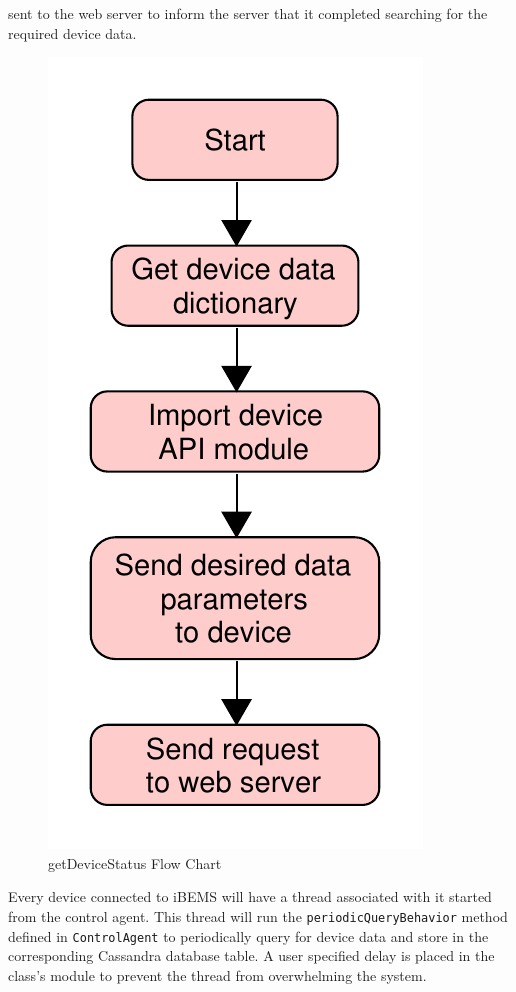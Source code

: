 \documentclass[conference]{IEEEtran}
\begin{document}
sent to the web server to inform the server that it completed searching for the
required device data. %
%
\begin{figure}[htbp]
    \centering
    \includegraphics[scale=0.3]{figs/agents/getDeviceStatus.pdf}
    \caption{getDeviceStatus Flow Chart}
    \label{fig:getDeviceStatus}
\end{figure}
%
Every device connected to iBEMS will have a thread associated with it started from the control agent. This thread will run the \texttt{periodicQueryBehavior} method defined in \texttt{ControlAgent} to periodically query for device data and store in the corresponding Cassandra database table. A user specified delay is placed in the class's module to prevent the thread from overwhelming the system.
\end{document}
